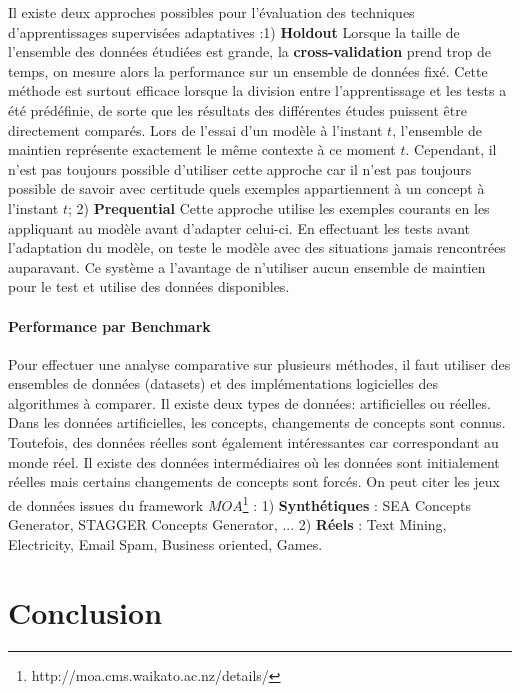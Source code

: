 \documentclass[utf8]{stageM2R} %
\theoremstyle{remark}
\renewcommand{\emph}{\textbf}
\begin{document}
Il existe deux approches possibles pour l'évaluation des techniques d'apprentissages supervisées adaptatives :1) \emph{Holdout} Lorsque la taille de l'ensemble des données étudiées est grande, la \emph{cross-validation} prend trop de temps, on mesure alors la performance sur un ensemble de données fixé. Cette méthode est surtout efficace lorsque la division entre l'apprentissage et les tests a été prédéfinie, de sorte que les résultats des différentes études puissent être directement comparés. Lors de l'essai d'un modèle à l'instant $t$, l'ensemble de maintien représente exactement le même contexte à ce moment $t$. Cependant, il n'est pas toujours possible d'utiliser cette approche car il n'est pas toujours possible de savoir avec certitude quels exemples appartiennent à un concept à l'instant $t$; 2) \emph{Prequential} Cette approche utilise les exemples courants en les appliquant au modèle avant d'adapter celui-ci. En effectuant les tests avant l'adaptation du modèle, on teste le modèle avec des situations jamais rencontrées auparavant. Ce système a l'avantage de n'utiliser aucun ensemble de maintien pour le test et utilise des données disponibles.


\subsubsection{Performance par Benchmark}
Pour effectuer une analyse comparative sur plusieurs méthodes, il faut utiliser des ensembles de données (datasets) et des implémentations logicielles des algorithmes à comparer. Il existe deux types de données: artificielles ou réelles. Dans les données artificielles, les concepts, changements de concepts sont connus. Toutefois, des données réelles sont également intéressantes car correspondant au monde réel. Il existe des données intermédiaires où les données sont initialement réelles mais certains changements de concepts sont forcés. On peut citer les jeux de données issues du framework $MOA$\footnote{http://moa.cms.waikato.ac.nz/details/} : 1) \emph{Synthétiques} : SEA Concepts Generator, STAGGER Concepts Generator, ... 2) \emph{Réels} : Text Mining, Electricity, Email Spam, Business oriented, Games.

\chapter{Conclusion} 

\end{document}
